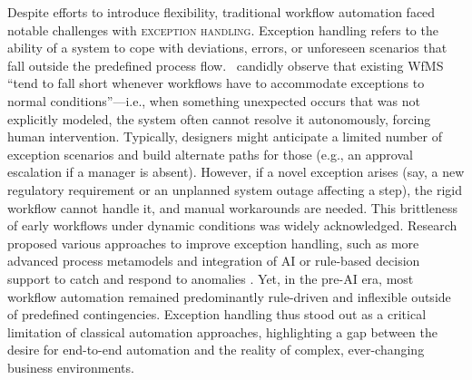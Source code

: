 Despite efforts to introduce flexibility, traditional workflow automation faced notable challenges with \textsc{exception handling}. Exception handling refers to the ability of a system to cope with deviations, errors, or unforeseen scenarios that fall outside the predefined process flow.~\textcite{basuResearch2002} candidly observe that existing WfMS \enquote{tend to fall short whenever workflows have to accommodate exceptions to normal conditions}---i.e., when something unexpected occurs that was not explicitly modeled, the system often cannot resolve it autonomously, forcing human intervention. Typically, designers might anticipate a limited number of exception scenarios and build alternate paths for those (e.g., an approval escalation if a manager is absent). However, if a novel exception arises (say, a new regulatory requirement or an unplanned system outage affecting a step), the rigid workflow cannot handle it, and manual workarounds are needed. This brittleness of early workflows under dynamic conditions was widely acknowledged. Research proposed various approaches to improve exception handling, such as more advanced process metamodels and integration of AI or rule-based decision support to catch and respond to anomalies \parencite{basuResearch2002}. Yet, in the pre-AI era, most workflow automation remained predominantly rule-driven and inflexible outside of predefined contingencies. Exception handling thus stood out as a critical limitation of classical automation approaches, highlighting a gap between the desire for end-to-end automation and the reality of complex, ever-changing business environments.

